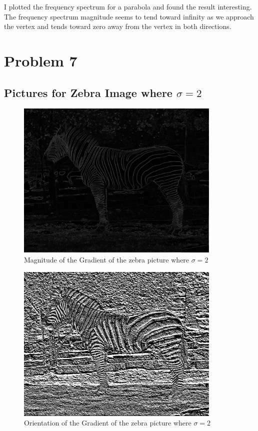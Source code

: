 \documentclass[11pt,psfig]{article}
\begin{document}
I plotted the frequency spectrum for a parabola and found the result interesting. The frequency spectrum magnitude seems to tend toward infinity as we approach the vertex and tends toward zero away from the vertex in both directions.\\
\newpage 

\section*{Problem 7}

\subsection*{Pictures for Zebra Image where $\sigma=2$}

\begin{figure}[H]
\centering
\includegraphics[height=3in]{magGradient_zebra1.jpg}
\caption{Magnitude of the Gradient of the zebra picture where $\sigma=2$}
\end{figure}

\begin{figure}[H]
\centering
\includegraphics[height=3in]{orientGradient_zebra1.jpg}
\caption{Orientation of the Gradient of the zebra picture where $\sigma=2$}
\end{figure}
\end{document}
